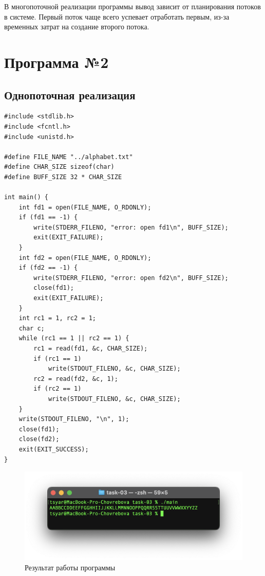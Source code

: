 В многопоточной реализации программы вывод зависит от планирования потоков в системе. Первый поток чаще всего успевает отработать первым, из-за временных затрат на создание второго потока.

\newpage
\section{Программа №2}

\subsection*{Однопоточная реализация}

\begin{lstlisting}[caption=Вторая программа (однопоточная),label=lst:FILEstruct111]
#include <stdlib.h>
#include <fcntl.h>
#include <unistd.h>

#define FILE_NAME "../alphabet.txt"
#define CHAR_SIZE sizeof(char)
#define BUFF_SIZE 32 * CHAR_SIZE

int main() {
	int fd1 = open(FILE_NAME, O_RDONLY);
	if (fd1 == -1) {
		write(STDERR_FILENO, "error: open fd1\n", BUFF_SIZE);
		exit(EXIT_FAILURE);
	}
	int fd2 = open(FILE_NAME, O_RDONLY);
	if (fd2 == -1) {
		write(STDERR_FILENO, "error: open fd2\n", BUFF_SIZE);
		close(fd1);
		exit(EXIT_FAILURE);
	}
	int rc1 = 1, rc2 = 1;
	char c;
	while (rc1 == 1 || rc2 == 1) {
		rc1 = read(fd1, &c, CHAR_SIZE);
		if (rc1 == 1)
			write(STDOUT_FILENO, &c, CHAR_SIZE);
		rc2 = read(fd2, &c, 1);
		if (rc2 == 1)
			write(STDOUT_FILENO, &c, CHAR_SIZE);
	}
	write(STDOUT_FILENO, "\n", 1);
	close(fd1);
	close(fd2);
	exit(EXIT_SUCCESS);
}
\end{lstlisting}

\begin{figure}[h!] 
	\centering
	\includegraphics[width=1.0\textwidth]{./img/second-01.png}
	\caption{Результат работы программы}
	\label{fig:111}
\end{figure}

